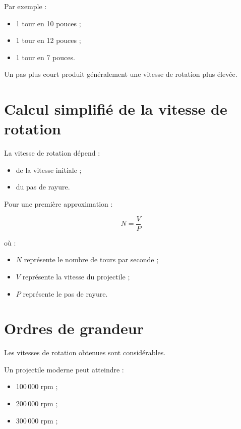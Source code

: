 Par exemple :

\begin{itemize}
    \item 1 tour en 10 pouces ;
    \item 1 tour en 12 pouces ;
    \item 1 tour en 7 pouces.
\end{itemize}

Un pas plus court produit généralement une vitesse de rotation plus élevée.

\section{Calcul simplifié de la vitesse de rotation}

La vitesse de rotation dépend :

\begin{itemize}
    \item de la vitesse initiale ;
    \item du pas de rayure.
\end{itemize}

Pour une première approximation :

\begin{equation}
N=\frac{V}{P}
\end{equation}

où :

\begin{itemize}
    \item $N$ représente le nombre de tours par seconde ;
    \item $V$ représente la vitesse du projectile ;
    \item $P$ représente le pas de rayure.
\end{itemize}

\section{Ordres de grandeur}

Les vitesses de rotation obtenues sont considérables.

Un projectile moderne peut atteindre :

\begin{itemize}
    \item 100\,000 rpm ;
    \item 200\,000 rpm ;
    \item 300\,000 rpm ;
\end{itemize}

